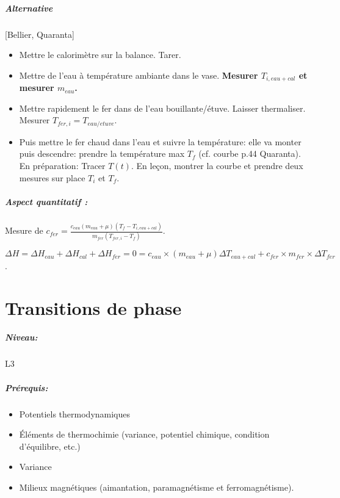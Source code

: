 \documentclass[11pt]{report}
\numberwithin{figure}{section}
\numberwithin{equation}{section}
\numberwithin{table}{section}
\newcommand{\1}{\boldsymbol{1}}
\begin{document}
\begin{tcolorbox}[breakable, enhanced, colback=red!2!white,colframe=mycolor!85!black,title=\textbf{\textbf{Expérience}}]
\paragraph{Alternative} [Bellier, Quaranta]
\begin{itemize}
\item Mettre le calorimètre sur la balance. Tarer.
\item Mettre de l'eau à température ambiante dans le vase. \textbf{Mesurer $T_{i,eau+cal}$ et mesurer $m_{eau}$.}
\item Mettre rapidement le fer dans de l'eau bouillante/étuve. Laisser thermaliser. Mesurer $T_{fer,i} = T_{eau/etuve}$. 
\item Puis mettre le fer chaud dans l'eau et suivre la température: elle va monter puis descendre: prendre la température max $T_f$ (cf. courbe p.44 Quaranta). En préparation: Tracer $T(t)$. En leçon, montrer la courbe et prendre deux mesures sur place $T_i$ et $T_f$. 
\end{itemize}

\paragraph*{Aspect quantitatif :} Mesure de  $c_{fer} = \frac{c_{eau} (m_{eau}+\mu) (T_f - T_{i,eau+cal})}{m_{fer} (T_{fer,i}-T_f)}$. 

$\Delta H = \Delta H_{eau} + \Delta H_{cal} + \Delta H_{fer} = 0 = c_{eau}\times (m_{eau} + \mu) \Delta T_{eau+cal} + c_{fer}\times m_{fer}\times \Delta T_{fer}$.


\end{tcolorbox}


\newpage


\newpage

\chapter{Transitions de phase}

\paragraph*{Niveau:} L3

\paragraph*{Prérequis:}
\begin{itemize}
\item Potentiels thermodynamiques
\item Éléments de thermochimie (variance, potentiel chimique, condition d'équilibre, etc.)
\item Variance
\item Milieux magnétiques (aimantation, paramagnétisme et ferromagnétisme).
\end{itemize}
\end{document}
